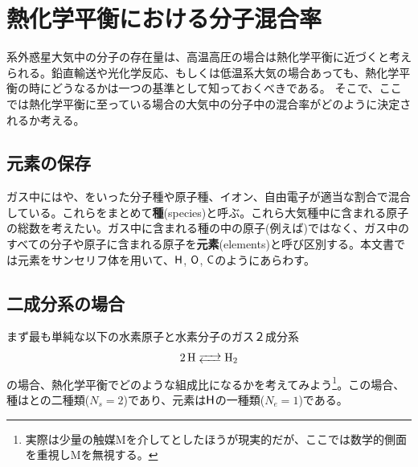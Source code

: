 \section{熱化学平衡における分子混合率}

系外惑星大気中の分子の存在量は、高温高圧の場合は熱化学平衡に近づくと考えられる。鉛直輸送や光化学反応、もしくは低温系大気の場合あっても、熱化学平衡の時にどうなるかは一つの基準として知っておくべきである。
そこで、ここでは熱化学平衡に至っている場合の大気中の分子中の混合率がどのように決定されるか考える。\\

\subsection*{元素の保存}

ガス中にはや、をいった分子種や原子種、イオン、自由電子が適当な割合で混合している。これらをまとめて{\bf 種}(species)と呼ぶ。これら大気種中に含まれる原子の総数を考えたい。ガス中に含まれる種の中の原子(例えば)ではなく、ガス中のすべての分子や原子に含まれる原子を{\bf 元素}(elements)と呼び区別する。本文書では元素をサンセリフ体を用いて、$\mathsf{H}$, $\mathsf{O}$, $\mathsf{C}$のようにあらわす。\\

\subsection*{二成分系の場合}

まず最も単純な以下の水素原子と水素分子のガス２成分系
\begin{align*}
\ce{2 H <--> H2}
\end{align*}
の場合、熱化学平衡でどのような組成比になるかを考えてみよう\footnote{実際は少量の触媒Mを介してとしたほうが現実的だが、ここでは数学的側面を重視しMを無視する。}。この場合、種はとの二種類($N_s = 2$)であり、元素は$\mathsf{H}$の一種類($N_e = 1$)である。

